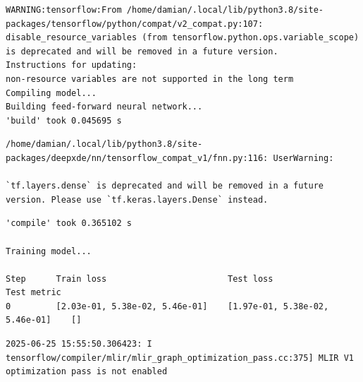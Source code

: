 \documentclass[
  spanish,
  us-letterpaper,
  DIV=11,
  numbers=noendperiod]{scrreprt}
\theoremstyle{definition}
\theoremstyle{plain}
\theoremstyle{remark}
\begin{document}
\begin{verbatim}
WARNING:tensorflow:From /home/damian/.local/lib/python3.8/site-packages/tensorflow/python/compat/v2_compat.py:107: disable_resource_variables (from tensorflow.python.ops.variable_scope) is deprecated and will be removed in a future version.
Instructions for updating:
non-resource variables are not supported in the long term
Compiling model...
Building feed-forward neural network...
'build' took 0.045695 s
\end{verbatim}

\begin{verbatim}
/home/damian/.local/lib/python3.8/site-packages/deepxde/nn/tensorflow_compat_v1/fnn.py:116: UserWarning:

`tf.layers.dense` is deprecated and will be removed in a future version. Please use `tf.keras.layers.Dense` instead.
\end{verbatim}

\begin{verbatim}
'compile' took 0.365102 s

Training model...

Step      Train loss                        Test loss                         Test metric
0         [2.03e-01, 5.38e-02, 5.46e-01]    [1.97e-01, 5.38e-02, 5.46e-01]    []  
\end{verbatim}

\begin{verbatim}
2025-06-25 15:55:50.306423: I tensorflow/compiler/mlir/mlir_graph_optimization_pass.cc:375] MLIR V1 optimization pass is not enabled
\end{verbatim}
\end{document}
